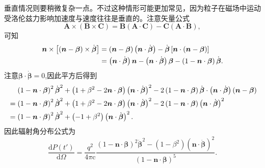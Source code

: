 \documentclass[../天体物理基础.tex]{subfiles}
\begin{document}
垂直情况则要稍微复杂一点。不过这种情形可能更加常见，因为粒子在磁场中运动受洛伦兹力影响加速度与速度往往是垂直的。注意矢量公式
\begin{equation}
\boldsymbol{A}\times\left(\boldsymbol{B}\times\boldsymbol{C}\right)=\boldsymbol{B}\left(\boldsymbol{A}\cdot\boldsymbol{C}\right)-\boldsymbol{C}\left(\boldsymbol{A}\cdot\boldsymbol{B}\right),
\end{equation}
可知
\begin{align}
\boldsymbol{n}\times\left[\left(\boldsymbol{n}-\boldsymbol{\beta}\right)\times\dot{\boldsymbol{\beta}}\right]&=\left(\boldsymbol{n}-\boldsymbol{\beta}\right)\left(\boldsymbol{n}\cdot\dot{\boldsymbol{\beta}}\right)-\dot{\boldsymbol{\beta}}\left[\boldsymbol{n}\cdot\left(\boldsymbol{n}-\boldsymbol{\beta}\right)\right]\notag\\
&=\left(\boldsymbol{n}\cdot\dot{\boldsymbol{\beta}}\right)\boldsymbol{n}-\left(\boldsymbol{n}\cdot\dot{\boldsymbol{\beta}}\right)\boldsymbol{\beta}-\left(1-\boldsymbol{n}\cdot\boldsymbol{\beta}\right)\dot{\boldsymbol{\beta}}.
\end{align}
注意$\boldsymbol{\beta}\cdot\dot{\boldsymbol{\beta}}=0$,因此平方后得到
\begin{align}
&\quad\,\left(1-\boldsymbol{n}\cdot\boldsymbol{\beta}\right)^{2}\dot{\boldsymbol{\beta}}^{2}+\left(1+\beta^{2}-2\boldsymbol{n}\cdot\boldsymbol{\beta}\right)\left(\boldsymbol{n}\cdot\dot{\boldsymbol{\beta}}\right)^{2}-2\left(1-\boldsymbol{n}\cdot\boldsymbol{\beta}\right)\dot{\boldsymbol{\beta}}\cdot\left(\boldsymbol{n}\cdot\dot{\boldsymbol{\beta}}\right)\left(\boldsymbol{n}-\boldsymbol{\beta}\right)\notag\\
&=\left(1-\boldsymbol{n}\cdot\boldsymbol{\beta}\right)^{2}\dot{\boldsymbol{\beta}}^{2}+\left(1+\beta^{2}-2\boldsymbol{n}\cdot\boldsymbol{\beta}\right)\left(\boldsymbol{n}\cdot\dot{\boldsymbol{\beta}}\right)^{2}-2\left(1-\boldsymbol{n}\cdot\boldsymbol{\beta}\right)\left(\boldsymbol{n}\cdot\dot{\boldsymbol{\beta}}\right)^{2}\notag\\
&=\left(1-\boldsymbol{n}\cdot\boldsymbol{\beta}\right)^{2}\dot{\boldsymbol{\beta}}^{2}+\left(-1+\beta^{2}\right)\left(\boldsymbol{n}\cdot\dot{\boldsymbol{\beta}}\right)^{2}.
\end{align}
因此辐射角分布公式为
\begin{equation}
\frac{\mathrm{d}P\left(t'\right)}{\mathrm{d}\Omega}=\frac{q^{2}}{4\pi\mathrm{c}}\frac{\left(1-\boldsymbol{n}\cdot\boldsymbol{\beta}\right)^{2}\dot{\boldsymbol{\beta}}^{2}-\left(1-\beta^{2}\right)\left(\boldsymbol{n}\cdot\dot{\boldsymbol{\beta}}\right)^{2}}{\left(1-\boldsymbol{n}\cdot\boldsymbol{\beta}\right)^{5}}.
\end{equation}
\end{document}
